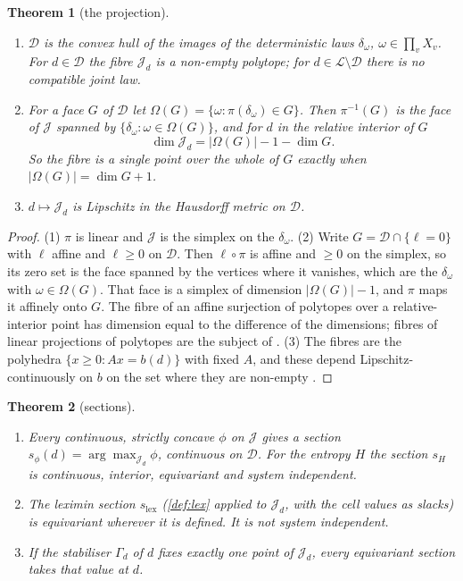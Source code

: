 \documentclass[11pt]{article}
\newtheorem{theorem}{Theorem}\newtheorem{proposition}[theorem]{Proposition}\newtheorem{lemma}[theorem]{Lemma}\newtheorem{corollary}[theorem]{Corollary}\newtheorem{conjecture}[theorem]{Conjecture}\crefname{conjecture}{Conjecture}{Conjectures}
\theoremstyle{definition}\newtheorem{definition}[theorem]{Definition}\newtheorem{remark}[theorem]{Remark}\newtheorem{example}[theorem]{Example}\newtheorem{problem}[theorem]{Open problem}\crefname{problem}{Problem}{Problems}
\begin{document}
\begin{theorem}[the projection]\label{thm:projection}
\begin{enumerate}
\item[(1)] $\mathcal D$ is the convex hull of the images of the deterministic laws $\delta_\omega$, $\omega\in\prod_vX_v$. For $d\in\mathcal D$ the fibre $\mathcal J_d$ is a non-empty polytope; for $d\in\mathcal L\setminus\mathcal D$ there is no compatible joint law.
\item[(2)] For a face $G$ of $\mathcal D$ let $\Omega(G)=\{\omega:\pi(\delta_\omega)\in G\}$. Then $\pi^{-1}(G)$ is the face of $\mathcal J$ spanned by $\{\delta_\omega:\omega\in\Omega(G)\}$, and for $d$ in the relative interior of $G$
\[
\dim\mathcal J_d=|\Omega(G)|-1-\dim G.
\]
So the fibre is a single point over the whole of $G$ exactly when $|\Omega(G)|=\dim G+1$.
\item[(3)] $d\mapsto\mathcal J_d$ is Lipschitz in the Hausdorff metric on $\mathcal D$.
\end{enumerate}
\end{theorem}

\begin{proof}
(1) $\pi$ is linear and $\mathcal J$ is the simplex on the $\delta_\omega$. (2) Write $G=\mathcal D\cap\{\ell=0\}$ with $\ell$ affine and $\ell\ge0$ on $\mathcal D$. Then $\ell\circ\pi$ is affine and $\ge0$ on the simplex, so its zero set is the face spanned by the vertices where it vanishes, which are the $\delta_\omega$ with $\omega\in\Omega(G)$. That face is a simplex of dimension $|\Omega(G)|-1$, and $\pi$ maps it affinely onto $G$. The fibre of an affine surjection of polytopes over a relative-interior point has dimension equal to the difference of the dimensions; fibres of linear projections of polytopes are the subject of \cite{BilleraSturmfels1992}. (3) The fibres are the polyhedra $\{x\ge0:Ax=b(d)\}$ with fixed $A$, and these depend Lipschitz-continuously on $b$ on the set where they are non-empty \cite{WalkupWets1969}.
\end{proof}

\begin{theorem}[sections]\label{thm:sections}
\begin{enumerate}
\item[(1)] Every continuous, strictly concave $\phi$ on $\mathcal J$ gives a section $s_\phi(d)=\arg\max_{\mathcal J_d}\phi$, continuous on $\mathcal D$. For the entropy $H$ the section $s_H$ is continuous, interior, equivariant and system independent.
\item[(2)] The leximin section $s_{\mathrm{lex}}$ (\cref{def:lex} applied to $\mathcal J_d$, with the cell values as slacks) is equivariant wherever it is defined. It is not system independent.
\item[(3)] If the stabiliser $\Gamma_d$ of $d$ fixes exactly one point of $\mathcal J_d$, every equivariant section takes that value at $d$.
\end{enumerate}
\end{theorem}
\end{document}
